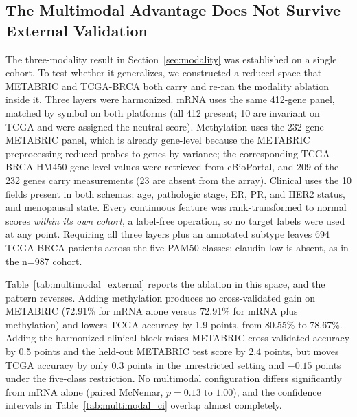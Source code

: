 \documentclass[10pt,journal,compsoc,twocolumn]{IEEEtran}
\begin{document}
\subsection{The Multimodal Advantage Does Not Survive External Validation}
\label{sec:external_multimodal}

The three-modality result in Section~\ref{sec:modality} was established on a single cohort. To test whether it generalizes, we constructed a reduced space that METABRIC and TCGA-BRCA both carry and re-ran the modality ablation inside it. Three layers were harmonized. mRNA uses the same 412-gene panel, matched by symbol on both platforms (all 412 present; 10 are invariant on TCGA and were assigned the neutral score). Methylation uses the 232-gene METABRIC panel, which is already gene-level because the METABRIC preprocessing reduced probes to genes by variance; the corresponding TCGA-BRCA HM450 gene-level values were retrieved from cBioPortal, and 209 of the 232 genes carry measurements (23 are absent from the array). Clinical uses the 10 fields present in both schemas: age, pathologic stage, ER, PR, and HER2 status, and menopausal state. Every continuous feature was rank-transformed to normal scores \emph{within its own cohort}, a label-free operation, so no target labels were used at any point. Requiring all three layers plus an annotated subtype leaves 694 TCGA-BRCA patients across the five PAM50 classes; claudin-low is absent, as in the n=987 cohort.

Table~\ref{tab:multimodal_external} reports the ablation in this space, and the pattern reverses. Adding methylation produces no cross-validated gain on METABRIC (72.91\% for mRNA alone versus 72.91\% for mRNA plus methylation) and lowers TCGA accuracy by 1.9 points, from 80.55\% to 78.67\%. Adding the harmonized clinical block raises METABRIC cross-validated accuracy by 0.5 points and the held-out METABRIC test score by 2.4 points, but moves TCGA accuracy by only 0.3 points in the unrestricted setting and $-0.15$ points under the five-class restriction. No multimodal configuration differs significantly from mRNA alone (paired McNemar, $p = 0.13$ to $1.00$), and the confidence intervals in Table~\ref{tab:multimodal_ci} overlap almost completely.
\end{document}
